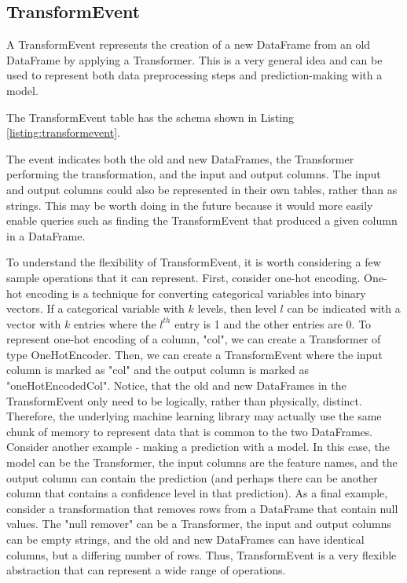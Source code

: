 \subsection{TransformEvent}
A TransformEvent represents the creation of a new DataFrame from an old DataFrame by
applying a Transformer. This is a very general idea and can be used to represent both
data preprocessing steps and prediction-making with a model.

The TransformEvent table has the schema shown in Listing \ref{listing:transformevent}.

The event indicates both the old and new DataFrames, the Transformer performing
the transformation, and the input and output columns. The input and output columns
could also be represented in their own tables, rather than as strings. This may
be worth doing in the future because it would more easily enable queries such as
finding the TransformEvent that produced a given column in a DataFrame.

To understand the flexibility of TransformEvent, it is worth considering a few
sample operations that it can represent. First, consider one-hot encoding. One-hot
encoding is a technique for converting categorical variables into binary vectors.
If a categorical variable with $k$ levels, then level $l$ can be indicated with
a vector with $k$ entries where the $l^{th}$ entry is 1 and the other entries are
0. To represent one-hot encoding of a column, "col", we can create a Transformer of
type OneHotEncoder. Then, we can create a TransformEvent where the input column
is marked as "col" and the output column is marked as "oneHotEncodedCol". Notice,
that the old and new DataFrames in the TransformEvent only need to be logically, rather
than physically, distinct. Therefore, the underlying machine learning library may
actually use the same chunk of memory to represent data that is common to the two 
DataFrames. Consider another example - making a prediction with a model. In this
case, the model can be the Transformer, the input columns are the feature names,
and the output column can contain the prediction (and perhaps there can be another
column that contains a confidence level in that prediction). As a final example,
consider a transformation that removes rows from a DataFrame that contain null values.
The "null remover" can be a Transformer, the input and output columns can be empty
strings, and the old and new DataFrames can have identical columns, but a differing
number of rows. Thus, TransformEvent is a very flexible abstraction that can represent
a wide range of operations.

